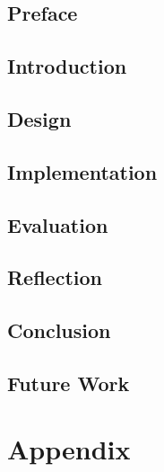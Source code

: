 





\chapter*{Preface}



\tableofcontents

\chapter{Introduction}





\chapter{Design}


\chapter{Implementation}


\chapter{Evaluation}




\chapter{Reflection}


\chapter{Conclusion}


\chapter{Future Work}


\printbibliography

\part{Appendix}
\appendix



